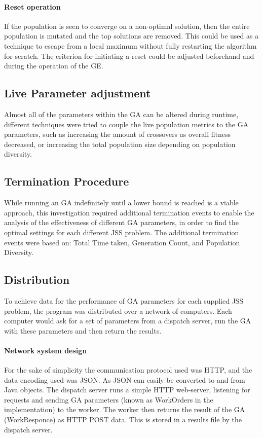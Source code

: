 \documentclass[14pt]{acmsiggraph}
\begin{document}
	\paragraph{Reset operation}
	If the population is seen to converge on a non-optimal solution, then the entire population is mutated and the top solutions are removed. This could be  used as a technique to escape from a local maximum without fully restarting the algorithm for scratch. The criterion for initiating a reset could be adjusted beforehand and during the operation of the GE.
	
	\subsection{Live Parameter adjustment}
	Almost all of the parameters within the GA can be altered during runtime, different techniques were tried to couple the live population metrics to the GA parameters, such as increasing the amount of crossovers as overall fitness decreased, or increasing the total population size depending on population diversity.
	
	\subsection{Termination Procedure}
	While running an GA indefinitely until a lower bound is reached is a viable approach, this investigation required additional termination events to enable the analysis of the effectiveness of different GA parameters, in order to find the optimal settings for each different JSS problem. The additional termination events were based on: Total Time taken, Generation Count, and Population Diversity.
	
	\subsection{Distribution}
	To achieve data for the performance of GA parameters for each supplied JSS problem, the program was distributed over a network of computers. Each computer would ask for a set of parameters from a dispatch server, run the GA with these parameters and then return the results.
	
	\paragraph{Network system design}
	For the sake of simplicity the communication protocol used was HTTP, and the data encoding used was JSON. As JSON can easily be converted to and from Java objects. The dispatch server runs a simple HTTP web-server, listening for requests and sending GA parameters (known as WorkOrders in the implementation) to the worker. The worker then returns the result of the GA (WorkResponce) as HTTP POST data. This is stored in a results file by the dispatch server. 
	
\end{document}
